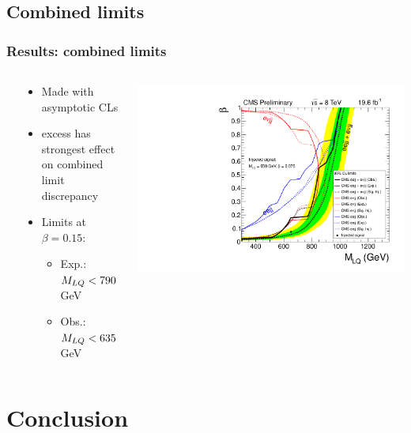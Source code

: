 \documentclass[bigger]{beamer}
\begin{document}
\subsection{Combined limits}
\label{sec-5-2}
\begin{frame}
\frametitle{Results: combined limits}
\label{sec-5-2-1}
\begin{columns} %
\label{sec-5-2-1-1}
\begin{column}{0.5\textwidth}
\label{sec-5-2-1-1-1}

\begin{itemize}
\item Made with asymptotic CLs
\item \enujj excess has strongest effect on combined limit discrepancy
\item Limits at $\beta = 0.15$:
\begin{itemize}
\item Exp.: $M_{LQ} < 790$ GeV
\item Obs.: $M_{LQ} < 635$ GeV
\end{itemize}
\end{itemize}
\end{column}
\begin{column}{0.5\textwidth}
\label{sec-5-2-1-1-2}

\centering
\includegraphics[width=\textwidth]{fig/limits/LQ1Combination_SignalInjection.pdf}
\end{column}
\end{columns}
\end{frame}
\section{Conclusion}
\label{sec-6}
\end{document}
